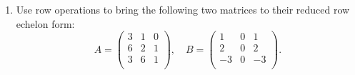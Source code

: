 	\begin{enumerate}
		\item Use row operations to bring the following two matrices to their reduced row echelon form:
			\begin{equation*}
				A=
				\begin{pmatrix}
					3 & 1 & 0\\
					6 & 2 & 1\\
					3 & 6 & 1\\
				\end{pmatrix},\quad
				B=
				\begin{pmatrix}
					1  & 0 & 1\\
					2  & 0 & 2\\
					-3 & 0 & -3\\
				\end{pmatrix}.
				\end{equation*}

					\if{}
\end{enumerate}
